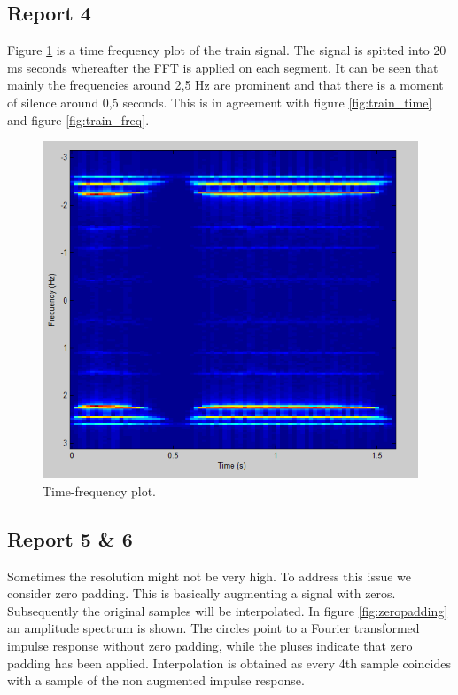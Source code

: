 \documentclass[final]{scrreprt} %
\begin{document}
\subsection{Report 4}

Figure \ref{fig:timefreq} is a time frequency plot of the train signal. 
The signal is spitted into 20 ms seconds whereafter the FFT is applied on each segment.
It can be seen that mainly the frequencies around 2,5 Hz are prominent and that there is a moment of silence around 0,5 seconds. 
This is in agreement with figure \ref{fig:train_time} and figure \ref{fig:train_freq}.

\begin{figure}[H]
\centering
\includegraphics[scale = 0.7]{resources/labday1_report4_timefrequency.png}
\caption{Time-frequency plot.}
\label{fig:timefreq}
\end{figure}

\subsection{Report 5 \& 6}

Sometimes the resolution might not be very high. 
To address this issue we consider zero padding.
This is basically augmenting a signal with zeros.
Subsequently the original samples will be interpolated.
In figure \ref{fig:zeropadding} an amplitude spectrum is shown.
The circles point to a Fourier transformed impulse response without zero padding, while the pluses indicate that zero padding has been applied.
Interpolation is obtained as every 4th sample coincides with a sample of the non augmented impulse response.
\end{document}
